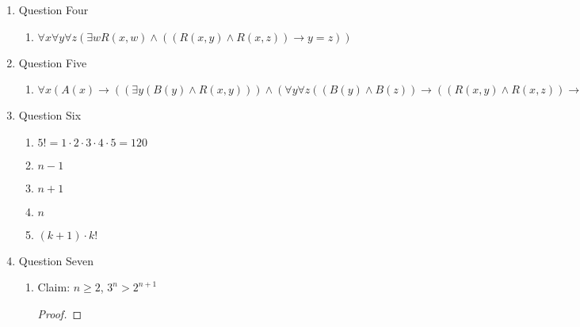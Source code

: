 \documentclass{article}
\begin{document}
\begin{enumerate}
\begin{enumerate}
        \item $\mathcal{M}_1, \mathcal{M}_2, \mathcal{M}_3$
        \item $\mathcal{M}_2$
        \item $\mathcal{M}_{10}$
    \end{enumerate}
    \item Question Four
    \begin{enumerate}
        \item $\forall x \forall y \forall z (\exists w R(x, w) \land ((R(x,y) \land R(x,z)) \rightarrow y = z))$
    \end{enumerate}
    \item Question Five
    \begin{enumerate}
        \item $\forall x (A(x) \rightarrow ((\exists y (B(y) \land R(x,y))) \land (\forall y \forall z ((B(y) \land B(z)) \rightarrow ((R(x,y) \land R(x,z)) \rightarrow y = z)))))$
    \end{enumerate}
    \item Question Six
    \begin{enumerate}
        \item $5! = 1 \cdot 2 \cdot 3 \cdot 4 \cdot 5 = 120$
        \item $n-1$
        \item $n+1$
        \item $n$
        \item $(k+1) \cdot k!$
    \end{enumerate}
    \item Question Seven
    \begin{enumerate}
        \item Claim: $n \geq 2$, $3^n > 2^{n+1}$
        \begin{proof}

\end{proof}
\end{enumerate}
\end{enumerate}
\end{document}

